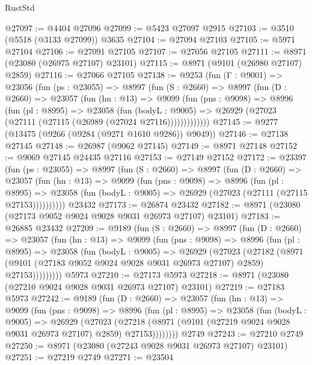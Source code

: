 \begin{lexlean}{RustStd}
\begin{coremodule}
@27097 := @4404 @27096
@27099 := @5423 @27097 @2915
@27103 := @3510 (@5518 (@3133 @27099)) @3635
@27104 := @27094 @27103
@27105 := @5971 @27104
@27106 := @27091 @27105
@27107 := @27056 @27105
@27111 := @8971 (@23080 (@26975 @27107) @23101)
@27115 := @8971 (@9101 (@26980 @27107) @2859)
@27116 := @27066 @27105
@27138 := @9253
    (fun (Γ : @9001) =>
    @23056
      (fun (ps : @23055) =>
      @8997
        (fun (S : @2660) =>
        @8997
          (fun (D : @2660) =>
          @23057
            (fun (hn : @13) =>
            @9099
              (fun (pns : @9098) =>
              @8996
                (fun (pl : @8995) =>
                @23058
                  (fun (bodyL : @9005) =>
                  @26929 (@27023 (@27111 (@27115 (@26989 (@27024 @27116)))))))))))))
@27145 := @9277 (@13475 (@9266 (@9284 (@9271 @1610 @9286)) @9049))
@27146 := @27138 @27145
@27148 := @26987 (@9062 @27145)
@27149 := @8971 @27148
@27152 := @9069 @27145 @24435 @27116
@27153 := @27149 @27152
@27172 := @23397
    (fun (ps : @23055) =>
    @8997
      (fun (S : @2660) =>
      @8997
        (fun (D : @2660) =>
        @23057
          (fun (hn : @13) =>
          @9099
            (fun (pns : @9098) =>
            @8996
              (fun (pl : @8995) =>
              @23058 (fun (bodyL : @9005) => @26929 (@27023 (@27111 (@27115 @27153))))))))))
    @23432
@27173 := @26874 @23432
@27182 := @8971 (@23080 (@27173 @9052 @9024 @9028 @9031 @26973 @27107) @23101)
@27183 := @26885 @23432
@27209 := @9189
    (fun (S : @2660) =>
    @8997
      (fun (D : @2660) =>
      @23057
        (fun (hn : @13) =>
        @9099
          (fun (pns : @9098) =>
          @8996
            (fun (pl : @8995) =>
            @23058
              (fun (bodyL : @9005) =>
              @26929
                (@27023
                  (@27182
                    (@8971
                      (@9101 (@27183 @9052 @9024 @9028 @9031 @26973 @27107) @2859)
                      @27153)))))))))
    @5973
@27210 := @27173 @5973
@27218 := @8971 (@23080 (@27210 @9024 @9028 @9031 @26973 @27107) @23101)
@27219 := @27183 @5973
@27242 := @9189
    (fun (D : @2660) =>
    @23057
      (fun (hn : @13) =>
      @9099
        (fun (pns : @9098) =>
        @8996
          (fun (pl : @8995) =>
          @23058
            (fun (bodyL : @9005) =>
            @26929
              (@27023
                (@27218 (@8971 (@9101 (@27219 @9024 @9028 @9031 @26973 @27107) @2859) @27153))))))))
    @2749
@27243 := @27210 @2749
@27250 := @8971 (@23080 (@27243 @9028 @9031 @26973 @27107) @23101)
@27251 := @27219 @2749
@27271 := @23504

\end{coremodule}
\end{lexlean}

